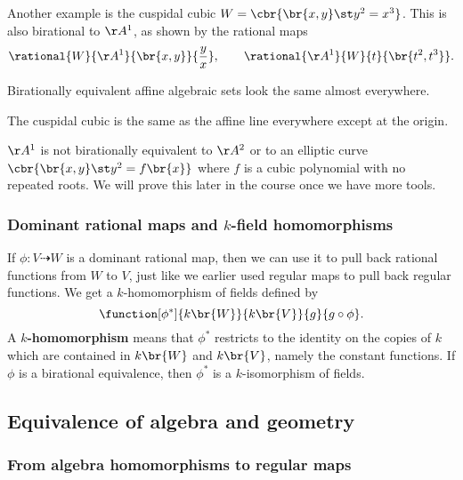 \begin{example*}
Another example is the cuspidal cubic $ W = \cbr{\br{x, y} \st y^2 = x^3} $. This is also birational to $ \AA^1 $, as shown by the rational maps
$$ \rational{W}{\AA^1}{\br{x, y}}{\dfrac{y}{x}}, \qquad \rational{\AA^1}{W}{t}{\br{t^2, t^3}}. $$
\end{example*}

Birationally equivalent affine algebraic sets look the same almost everywhere.

\begin{example*}
The cuspidal cubic is the same as the affine line everywhere except at the origin.
\end{example*}

\begin{example*}
$ \AA^1 $ is not birationally equivalent to $ \AA^2 $ or to an elliptic curve $ \cbr{\br{x, y} \st y^2 = f\br{x}} $ where $ f $ is a cubic polynomial with no repeated roots. We will prove this later in the course once we have more tools.
\end{example*}

\subsubsection{Dominant rational maps and \texorpdfstring{$ k $}{k}-field homomorphisms}

If $ \phi : V \dashrightarrow W $ is a dominant rational map, then we can use it to pull back rational functions from $ W $ to $ V $, just like we earlier used regular maps to pull back regular functions. We get a $ k $-homomorphism of fields defined by
$$ \function[\phi^*]{k\br{W}}{k\br{V}}{g}{g \circ \phi}. $$
A \textbf{$ k $-homomorphism} means that $ \phi^* $ restricts to the identity on the copies of $ k $ which are contained in $ k\br{W} $ and $ k\br{V} $, namely the constant functions. If $ \phi $ is a birational equivalence, then $ \phi^* $ is a $ k $-isomorphism of fields.

\subsection{Equivalence of algebra and geometry}

\subsubsection{From algebra homomorphisms to regular maps}

